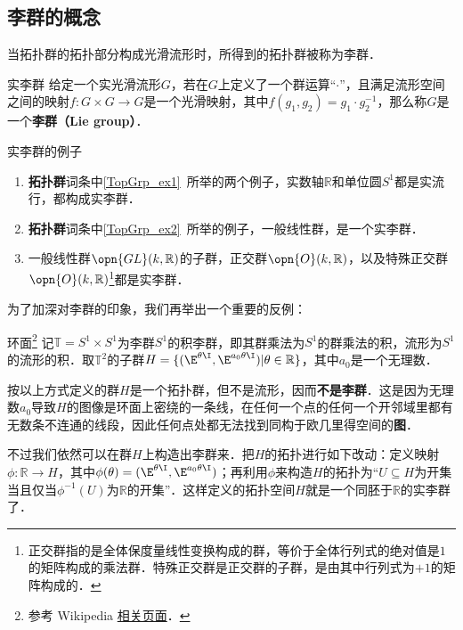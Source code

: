 

\subsection{李群的概念}

当拓扑群的拓扑部分构成光滑流形时，所得到的拓扑群被称为李群．

\begin{definition}{实李群}
给定一个实光滑流形$G$，若在$G$上定义了一个群运算“$\cdot$”，且满足流形空间之间的映射$f:G\times G\rightarrow G$是一个光滑映射，其中$f(g_1, g_2)=g_1\cdot g_2^{-1}$，那么称$G$是一个\textbf{李群（Lie group）}．
\end{definition}

\begin{example}{实李群的例子}
\begin{enumerate}
\item \textbf{拓扑群}词条中\autoref{TopGrp_ex1}~所举的两个例子，实数轴$\mathbb{R}$和单位圆$S^1$都是实流行，都构成实李群．
\item \textbf{拓扑群}词条中\autoref{TopGrp_ex2}~所举的例子，一般线性群，是一个实李群．
\item 一般线性群$\opn{GL}(k, \mathbb{R})$的子群，正交群$\opn{O}(k, \mathbb{R})$，以及特殊正交群$\opn{O}(k, \mathbb{R})$\footnote{正交群指的是全体保度量线性变换构成的群，等价于全体行列式的绝对值是$1$的矩阵构成的乘法群．特殊正交群是正交群的子群，是由其中行列式为$+1$的矩阵构成的．}都是实李群．
\end{enumerate}
\end{example}

为了加深对李群的印象，我们再举出一个重要的反例：

\begin{definition}{环面\footnote{参考 Wikipedia \href{https://en.wikipedia.org/wiki/Lie_group}{相关页面}．}}
记$\mathbb{T}=S^1\times S^1$为李群$S^1$的积李群，即其群乘法为$S^1$的群乘法的积，流形为$S^1$的流形的积．取$\mathbb{T}^2$的子群$H=\{(\E^{\theta\I}, \E^{a_0\theta\I})|\theta\in\mathbb{R}\}$，其中$a_0$是一个无理数．

按以上方式定义的群$H$是一个拓扑群，但不是流形，因而\textbf{不是李群}．这是因为无理数$a_0$导致$H$的图像是环面上密绕的一条线，在任何一个点的任何一个开邻域里都有无数条不连通的线段，因此任何点处都无法找到同构于欧几里得空间的\textbf{图}．

不过我们依然可以在群$H$上构造出李群来．把$H$的拓扑进行如下改动：定义映射$\phi:\mathbb{R}\to H$，其中$\phi(\theta)=(\E^{\theta\I}, \E^{a_0\theta\I})$；再利用$\phi$来构造$H$的拓扑为“$U\subseteq H$为开集当且仅当$\phi^{-1}(U)$为$\mathbb{R}$的开集”．这样定义的拓扑空间$H$就是一个同胚于$\mathbb{R}$的实李群了．
\end{definition}






